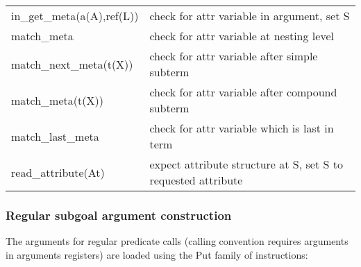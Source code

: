 \begin{tabular}{|p{}|p{}|}
\hline
in_get_meta(a(A),ref(L))        & check for attr variable in argument, set S \\
match_meta                      & check for attr variable at nesting level \\
match_next_meta(t(X))           & check for attr variable after simple subterm \\
match_meta(t(X))                & check for attr variable after compound subterm \\
match_last_meta                 & check for attr variable which is last in term \\
read_attribute(At)              & expect attribute structure at S, set S to requested attribute \\
\hline
\end{tabular}


\subsubsection{Regular subgoal argument construction}
The arguments for regular predicate calls (calling convention requires
arguments in arguments registers) are loaded using the Put family of
instructions:


